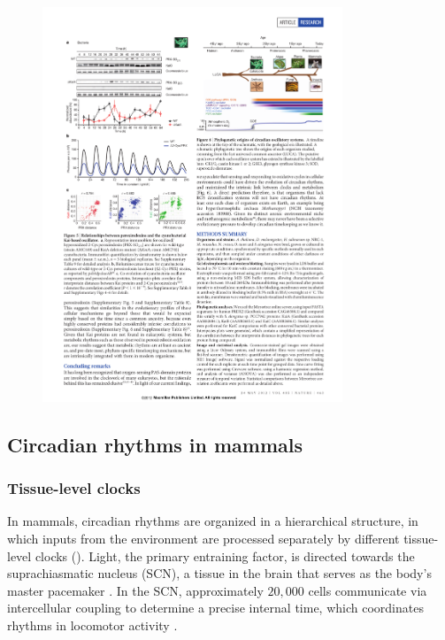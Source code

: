 \begin{figure}[tbp]
  \centering
\includegraphics[width=0.8\textwidth]{chap1/figures/edgar_ros.pdf}
  \label{fig:edgarros}
\end{figure}

\subsection{Circadian rhythms in mammals}

\subsubsection{Tissue-level clocks}

In mammals, circadian rhythms are organized in a hierarchical structure, in which inputs from the environment are processed separately by different tissue-level clocks (). 
Light, the primary entraining factor, is directed towards the suprachiasmatic nucleus (SCN), a tissue in the brain that serves as the body's master pacemaker \cite{Ralph1990}. 
In the SCN, approximately $20,000$ cells communicate via intercellular coupling to determine a precise internal time, which coordinates rhythms in locomotor activity \cite{Aton2005}.

